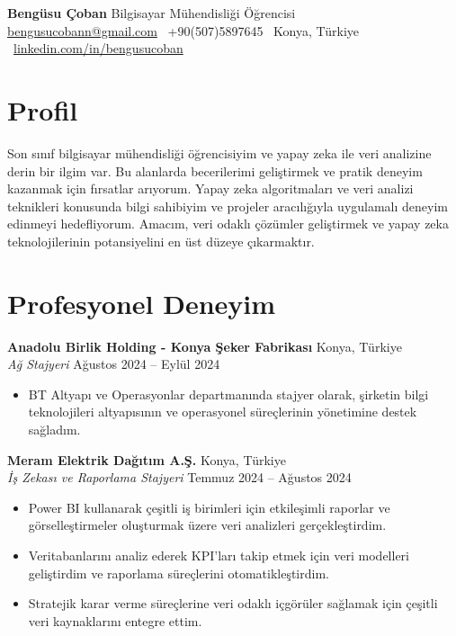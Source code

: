 \documentclass[10pt,a4paper]{extarticle}
\begin{document}
\begin{center}
    \begin{minipage}{\textwidth}
        \centering
        {\LARGE\textbf{Bengüsu Çoban}} \hspace{2pt} {\LARGE{Bilgisayar Mühendisliği Öğrencisi}}\\[10pt]
        \href{mailto:bengusucobann@gmail.com}{bengusucobann@gmail.com} \textbullet\
        +90(507)5897645 \textbullet\
        Konya, Türkiye \textbullet\
        \href{https://linkedin.com/in/bengüsu-ç-a26b6031b}{linkedin.com/in/bengusucoban}
    \end{minipage}
\end{center}
\section{Profil}
Son sınıf bilgisayar mühendisliği öğrencisiyim ve yapay zeka ile veri analizine derin bir ilgim var. Bu alanlarda becerilerimi geliştirmek ve pratik deneyim kazanmak için fırsatlar arıyorum. Yapay zeka algoritmaları ve veri analizi teknikleri konusunda bilgi sahibiyim ve projeler aracılığıyla uygulamalı deneyim edinmeyi hedefliyorum. Amacım, veri odaklı çözümler geliştirmek ve yapay zeka teknolojilerinin potansiyelini en üst düzeye çıkarmaktır.

\section{Profesyonel Deneyim}
\textbf{Anadolu Birlik Holding - Konya Şeker Fabrikası} \hfill Konya, Türkiye\\
\textit{Ağ Stajyeri} \hfill Ağustos 2024 -- Eylül 2024
\begin{itemize}[leftmargin=*,noitemsep,topsep=0pt]
    \item BT Altyapı ve Operasyonlar departmanında stajyer olarak, şirketin bilgi teknolojileri altyapısının ve operasyonel süreçlerinin yönetimine destek sağladım.
\end{itemize}

\textbf{Meram Elektrik Dağıtım A.Ş.} \hfill Konya, Türkiye\\
\textit{İş Zekası ve Raporlama Stajyeri} \hfill Temmuz 2024 -- Ağustos 2024
\begin{itemize}[leftmargin=*,noitemsep,topsep=0pt]
    \item Power BI kullanarak çeşitli iş birimleri için etkileşimli raporlar ve görselleştirmeler oluşturmak üzere veri analizleri gerçekleştirdim.
    \item Veritabanlarını analiz ederek KPI'ları takip etmek için veri modelleri geliştirdim ve raporlama süreçlerini otomatikleştirdim.
    \item Stratejik karar verme süreçlerine veri odaklı içgörüler sağlamak için çeşitli veri kaynaklarını entegre ettim.
\end{itemize}
\end{document}
